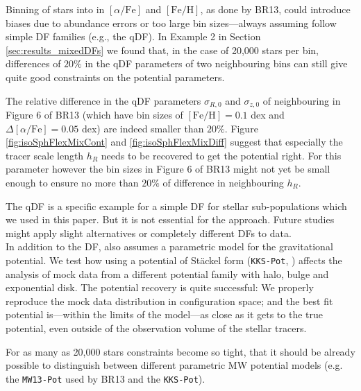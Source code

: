 Binning of stars into \MAPs{} in $[\alpha/\mathrm{Fe}]$ and $[\mathrm{Fe}/\mathrm{H}]$, as done by BR13, could introduce biases due to abundance errors or too large bin sizes---always assuming \MAPs{} follow simple DF families (e.g., the qDF). In Example 2 in Section \ref{sec:results_mixedDFs} we found that, in the case of 20,000 stars per bin, differences of $20\%$ in the qDF parameters of two neighbouring bins can still give quite good constraints on the potential parameters.

The relative difference in the qDF parameters $\sigma_{R,0}$ and $\sigma_{z,0}$ of neighbouring \MAPs{} in Figure 6 of BR13 (which have bin sizes of $[\mathrm{Fe}/\mathrm{H}] = 0.1$ dex and $\Delta [\alpha/\mathrm{Fe}] = 0.05$ dex) are indeed smaller than $20\%$. Figure \ref{fig:isoSphFlexMixCont} and \ref{fig:isoSphFlexMixDiff} suggest that especially the tracer scale length $h_R$ needs to be recovered to get the potential right. For this parameter however the bin sizes in Figure 6 of BR13 might not yet be small enough to ensure no more than $20\%$ of difference in neighbouring $h_R$.

The qDF is a specific example for a simple DF for stellar sub-populations which we used in this paper. But it is not essential for the \RM{} approach. Future studies might apply slight alternatives or completely different DFs to data.\\


 In addition to the DF, \RM{} also assumes a parametric model for the gravitational potential. We test how using a potential of St\"{a}ckel form (\texttt{KKS-Pot}, \citealt{1994AA...287...43B}) affects the \RM{} analysis of mock data from a different potential family with halo, bulge and exponential disk. The potential recovery is quite successful: We properly reproduce the mock data distribution in configuration space; and the best fit potential is---within the limits of the model---as close as it gets to the true potential, even outside of the observation volume of the stellar tracers. 

For as many as 20,000 stars constraints become so tight, that it should be already possible to distinguish between different parametric MW potential models (e.g. the \texttt{MW13-Pot} used by BR13 and the \texttt{KKS-Pot}).  

